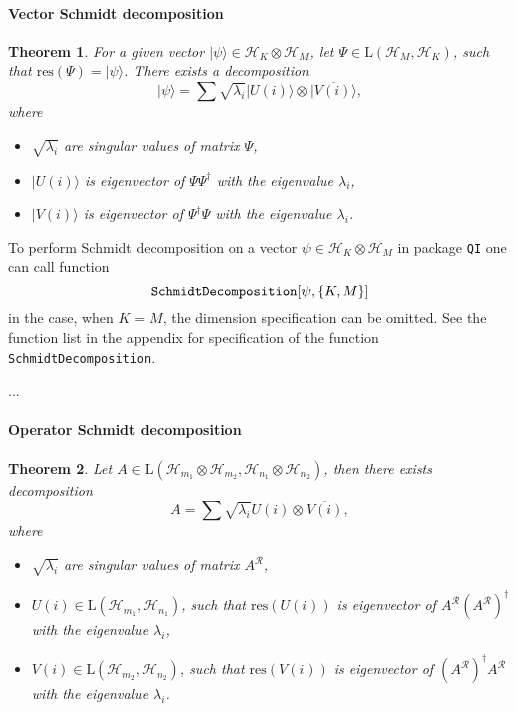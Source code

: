 \documentclass[11pt,a4paper]{article}
\newcommand{\qi}{\texttt{QI}}
\newcommand{\res}{\mathrm{res}}
\newcommand{\reshuffle}[1]{{#1}^{\mathcal{R}}}
\newcommand{\ket}[1]{\ensuremath{|#1\rangle}}
\newcommand{\Hilb}[1]{\mathcal{H}_{#1}}
\newcommand{\Lin}{\mathrm{L}}
\newcommand{\1}{{\bf 1}}
\newtheorem{theorem}{Theorem}
\begin{document}
\paragraph{Vector Schmidt decomposition}
\begin{theorem} \label{th:Schmidt-Decomposition}
For a given vector  $\ket{\psi} \in \Hilb{K}\otimes \Hilb{M}$,
let $\Psi \in \Lin(\Hilb{M},\Hilb{K})$, such that $\res(\Psi) = \ket{\psi}$.
There exists a decomposition
\begin{equation}
 \ket{\psi} = 
 \sum \sqrt{\lambda_i} \ket{U(i)} \otimes \overline{\ket{V(i)}},
\end{equation}
where 
\begin{itemize}
 \item $\sqrt{\lambda_i}$ are singular values of matrix $\Psi$,
 \item $\ket{U(i)}$ is eigenvector of
$\Psi\Psi^{\dagger}$
 with the eigenvalue $\lambda_i$,
 \item $\ket{V(i)}$ is eigenvector of 
$\Psi^{\dagger} \Psi$
 with the eigenvalue $\lambda_i$.
\end{itemize}
\end{theorem}

To perform Schmidt decomposition on a vector $\psi \in \Hilb{K}\otimes
\Hilb{M}$ in package \qi{} one can call function
\begin{equation}
\text{\texttt{SchmidtDecomposition}}[ \psi, \{K,M\}]
\end{equation} 
in the case, when $K=M$, the dimension specification can be omitted.
See the function list in the appendix for specification of the function
\texttt{SchmidtDecomposition}.

...

\paragraph{Operator Schmidt decomposition}
\begin{theorem} \label{th:Operator-Schmidt-Decomposition}
Let $A \in \Lin(\Hilb{m_1}\otimes \Hilb{m_2},\Hilb{n_1}\otimes \Hilb{n_2})$,
then there exists decomposition
\begin{equation}
 A = \sum \sqrt{\lambda_i} U(i) \otimes \overline{V(i)},
\end{equation}
where 
\begin{itemize}
 \item $\sqrt{\lambda_i}$ are singular values of matrix $\reshuffle{A}$,
 \item $U(i) \in \Lin(\Hilb{m_1}, \Hilb{n_1})$, such that $\res(U(i))$ is eigenvector of $\reshuffle{A} (\reshuffle{A})^{\dagger}$
 with the eigenvalue $\lambda_i$,
\item $V(i) \in \Lin(\Hilb{m_2}, \Hilb{n_2})$, such that $\res(V(i))$ is eigenvector of $(\reshuffle{A})^{\dagger} \reshuffle{A}$
 with the eigenvalue $\lambda_i$.
\end{itemize}
\end{theorem}
\end{document}
